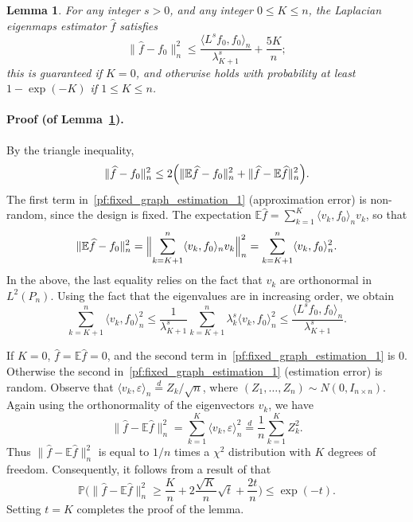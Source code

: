 \documentclass[aos]{imsart}
\theoremstyle{plain}
\newtheorem{lemma}{Lemma}
\theoremstyle{definition}
\theoremstyle{remark}
\newcommand{\Ebb}{\mathbb{E}}
\newcommand{\Pbb}{\mathbb{P}}
\newcommand{\dotp}[2]{\langle #1, #2 \rangle}
\newcommand{\wh}[1]{\widehat{#1}}
\newcommand{\1}{\mathbf{1}}
\begin{document}
\begin{lemma}
	\label{lem:fixed_graph_estimation}
	For any integer $s > 0$, and any integer $0 \leq K \leq n$, the Laplacian eigenmaps estimator $\wh{f}$ satisfies
	\begin{equation}
	\label{eqn:fixed_graph_estimation}
	\|\wh{f} - f_0\|_n^2 \leq \frac{\dotp{L^sf_0}{f_0}_n}{\lambda_{K + 1}^s} + \frac{5K}{n};
	\end{equation}
	this is guaranteed if $K = 0$, and otherwise holds with probability at least $1 - \exp(-K)$ if $1 \leq K \leq n$. 
\end{lemma}
\paragraph{Proof (of Lemma~\ref{lem:fixed_graph_estimation}).}
By the triangle inequality,
\begin{equation}
\label{pf:fixed_graph_estimation_1}
\|\wh{f} - f_0\|_n^2 \leq 2\Bigl(\|\mathbb{E}\wh{f} - f_0\|_n^2 + \|\wh{f} - \mathbb{E}\wh{f}\|_n^2\Bigr).
\end{equation}
The first term in~\eqref{pf:fixed_graph_estimation_1} (approximation error) is non-random, since the design is fixed. The expectation $\mathbb{E}\wh{f} = \sum_{k = 1}^{K} \dotp{v_k}{f_0}_n v_k$, so that
\begin{equation*}
\|\mathbb{E}\wh{f} - f_0\|_n^2 = \Bigl\|\sum_{k = K + 1}^{n} \dotp{v_k}{f_0}_n v_k\Bigr\|_n^2 = \sum_{k = K + 1}^n \dotp{v_k}{f_0}_n^2.
\end{equation*}
In the above, the last equality relies on the fact that $v_k$ are orthonormal in $L^2(P_n)$. Using the fact that the eigenvalues are in increasing order, we obtain
\begin{equation*}
\sum_{k = K + 1}^n \dotp{v_k}{f_0}_n^2 \leq \frac{1}{\lambda_{K + 1}^s} \sum_{k = K + 1}^n \lambda_k^s \dotp{v_k}{f_0}_n^2 \leq \frac{\dotp{L^sf_0}{f_0}_n}{\lambda_{K + 1}^s}.
\end{equation*}

If $K = 0$, $\wh{f} = \Ebb{\wh{f}} = 0$, and the second term in~\eqref{pf:fixed_graph_estimation_1} is $0$. Otherwise the second   in~\eqref{pf:fixed_graph_estimation_1} (estimation error) is random. Observe that $\dotp{v_k}{\varepsilon}_n \overset{d}{=} Z_k/\sqrt{n}$, where $(Z_1,\ldots,Z_n) \sim N(0,I_{n \times n})$. Again using the orthonormality of the eigenvectors $v_k$, we have
\begin{equation*}
\|\wh{f} - \mathbb{E}\wh{f}\|_n^2 = \sum_{k = 1}^{K} \dotp{v_k}{\varepsilon}_n^2 \overset{d}{=} \frac{1}{n}\sum_{k = 1}^{K} Z_k^2.
\end{equation*}
Thus $\|\wh{f} - \mathbb{E}\wh{f}\|_n^2$ is equal to $1/n$ times a $\chi^2$ distribution with $K$ degrees of freedom. Consequently, it follows from a result of \citep{laurent00} that
\begin{equation*}
\Pbb\biggl(\|\wh{f} - \mathbb{E}\wh{f}\|_n^2 \geq \frac{K}{n} + 2\frac{\sqrt{K}}{n}\sqrt{t} + \frac{2t}{n}\biggr) \leq \exp(-t).
\end{equation*}
Setting $t = K$ completes the proof of the lemma.
\end{document}
